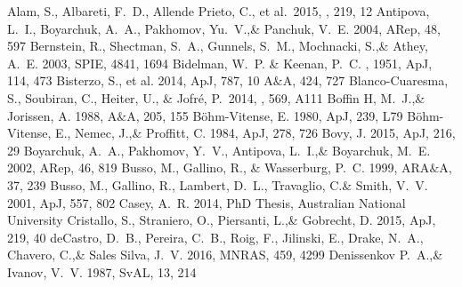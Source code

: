 \documentclass[a4paper,fleqn,usenatbib]{mnras}
\begin{document}
\begin{thebibliography}{99}
 Alam, S., Albareti, F.~D., Allende Prieto, C., et al.\ 2015, \apjs, 219, 12 
Antipova, L.~I., Boyarchuk, A.~A., Pakhomov, Yu.~V.,\& Panchuk, V.~E. 2004, 
ARep, 48, 597
Bernstein, R., Shectman, S.~A., Gunnels, S.~M., Mochnacki, S.,\& Athey, A.~E. 2003, 
SPIE, 4841, 1694    
Bidelman, W.~P. \& Keenan, P.~C. , 1951, ApJ, 114, 473
Bisterzo, S., et al. 2014, 
ApJ, 787, 10
A$\&$A, 424, 727
 Blanco-Cuaresma, S., Soubiran, C., Heiter, U., \& Jofr{\'e}, P.\ 2014, \aap, 569, A111 
Boffin H, M.~J.,\& Jorissen, A. 1988, 
A$\&$A, 205, 155
B\"ohm-Vitense, E. 1980, 
ApJ, 239, L79
B\"ohm-Vitense, E., Nemec, J.,\& Proffitt, C. 1984, 
ApJ, 278, 726
Bovy, J. 2015, 
ApJ, 216, 29
Boyarchuk, A.~A., Pakhomov, Y.~V., Antipova, L.~I.,\& Boyarchuk, M.~E. 2002, 
ARep, 46, 819
Busso, M., Gallino, R., \& Wasserburg, P.~C. 1999, 
ARA$\&$A, 37, 239
Busso, M., Gallino, R., Lambert, D.~L., Travaglio, C.\& Smith, V.~V. 2001, 
ApJ, 557, 802
Casey, A.~R. 2014, 
PhD Thesis, Australian National University
Cristallo, S., Straniero, O., Piersanti, L.,\& Gobrecht, D. 2015, 
ApJ, 219, 40
deCastro, D.~B., Pereira, C.~B., Roig, F., Jilinski, E., Drake, N.~A., Chavero, C.,\& Sales Silva, J.~V. 2016, 
MNRAS, 459, 4299
Denissenkov P.~A.,\& Ivanov, V.~V. 1987, 
SvAL, 13, 214

\end{thebibliography}
\end{document}
